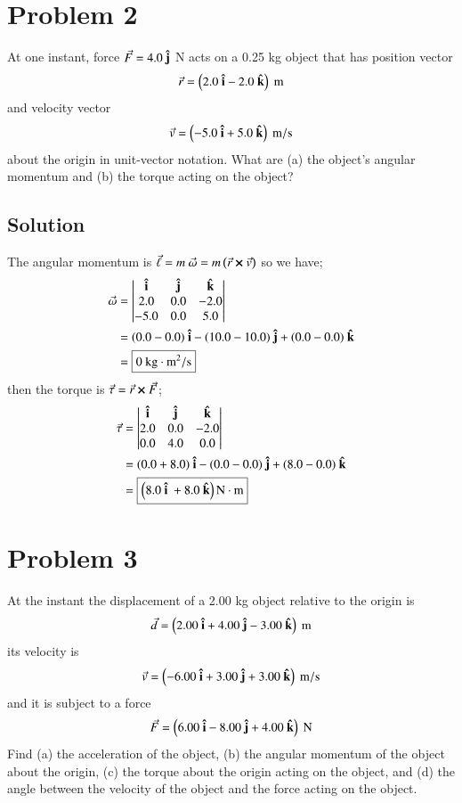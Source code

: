 \documentclass{article}
\begin{document}
\section*{Problem 2}
At one instant, force $\vec{F} = 4.0\ \vu{j}$ N acts on a 0.25 kg object that has position vector
\[
	\vec r = \left( 2.0\ \vu i - 2.0\ \vu k \right)\ \text{m}
\]
and velocity vector
\[
	\vec v = \left( -5.0\ \vu i + 5.0\ \vu k \right)\ \text{m}/\text{s}
\]
about the origin in unit-vector notation. What are (a) the object's angular momentum and (b) the torque acting on the object?

\subsection*{Solution}
The angular momentum is $\vec \ell = m\ \vec \omega = m \left( \vec r \cross \vec v \right)$ so we have;
\begin{align*}
	\vec \omega &= \begin{vmatrix}
		\vu i & \vu j & \vu k \\
		2.0 & 0.0 & -2.0 \\
		-5.0 & 0.0 & 5.0
		\end{vmatrix} \\
		    &= (0.0-0.0)\ \vu i - (10.0-10.0)\ \vu j + (0.0-0.0)\ \vu k \\
		    &= \boxed{0\ \text{kg}\cdot\text{m}^2/\text{s}}
\end{align*}
then the torque is $\vec \tau = \vec r \cross \vec F$;
\begin{align*}
	\vec \tau &= \begin{vmatrix}
		\vu i & \vu j & \vu k \\
		2.0 & 0.0 & -2.0 \\
		0.0 & 4.0 & 0.0
		\end{vmatrix} \\
		    &= (0.0+8.0)\ \vu i - (0.0-0.0)\ \vu j + (8.0-0.0)\ \vu k \\
		    &= \boxed{\left( 8.0\ \vu i\ + 8.0\ \vu k\right) \text{N}\cdot\text{m}}
\end{align*}

\section*{Problem 3}
At the instant the displacement of a 2.00 kg object relative to the origin is
\[
	\vec d = \left( 2.00\ \vu i + 4.00\ \vu j - 3.00\ \vu k \right)\ \text{m}
\]
its velocity is
\[
	\vec v = \left( -6.00\ \vu i + 3.00\ \vu j + 3.00\ \vu k \right)\ \text{m}/\text{s}
\]
and it is subject to a force
\[
	\vec F = \left(6.00\ \vu i - 8.00\ \vu j + 4.00\ \vu k \right)\ \text{N}
\]
Find (a) the acceleration of the object, (b) the angular momentum of the object about the origin, (c) the torque about the origin acting on the object, and (d) the angle between the velocity of the object and the force acting on the object.
\end{document}
